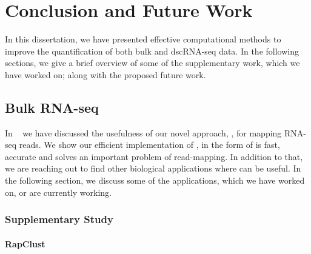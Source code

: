 
\chapter{Conclusion and Future Work} %
\label{conclusion} %



In this dissertation, we have presented effective computational methods to improve the quantification 
of both bulk and dscRNA-seq data. In the following sections, we
give a brief overview of some of the supplementary work, which we have worked on;
along with the proposed future work.

\section{Bulk RNA-seq}

In ~ we have discussed the usefulness of our novel approach, \qm, 
for mapping RNA-seq reads. We show our efficient implementation of \qm, in the 
form of \rapmap is fast, accurate and solves an important problem of read-mapping. 
In addition to that, we are reaching out to find other biological applications where 
\rapmap can be useful. In the following section, we discuss some of the applications, 
which we have worked on, or are currently working. 

\subsection{Supplementary Study}
\subsubsection{RapClust~\citep{srivastava2016accurate}}

